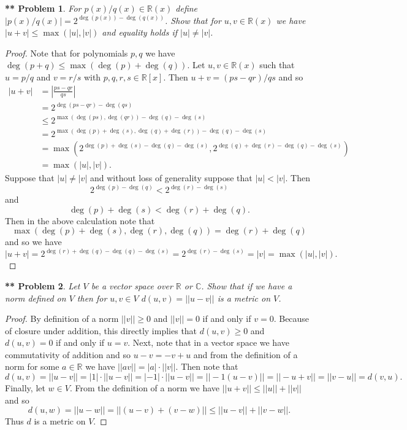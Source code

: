 \documentclass{article}
\newtheorem{**}{** Problem}
\begin{document}
\begin{flushleft}
\begin{**}
For $p(x)/q(x) \in \mathbb{R}(x)$ define $|p(x)/q(x)| = 2^{\deg(p(x))-\deg(q(x))}$. Show that for $u,v \in \mathbb{R}(x)$ we have $|u+v| \leq \max (|u|, |v|)$ and equality holds if $|u| \neq |v|$.
\end{**}
\begin{proof}
Note that for polynomials $p,q$ we have $\deg(p + q) \leq \max (\deg(p) + \deg(q))$. Let $u,v \in \mathbb{R}(x)$ such that $u = p/q$ and $v = r/s$ with $p,q,r,s \in \mathbb{R}[x]$. Then $u + v = (ps - qr)/qs$ and so
\begin{align*}
|u+v|
&= \left | \frac{ps - qr}{qs} \right |\\
&= 2^{\deg(ps - qr) - \deg(qs)}\\
&\leq 2^{\max (\deg(ps), \deg(qr)) - \deg(q) - \deg(s)}\\
&= 2^{\max (\deg(p) + \deg(s), \deg(q) + \deg(r)) - \deg(q) - \deg(s)}\\
&= \max (2^{\deg(p) + \deg(s) - \deg(q) - \deg(s)}, 2^{\deg(q) + \deg(r) - \deg(q) - \deg(s)})\\
&= \max (|u|, |v|).
\end{align*}
Suppose that $|u| \neq |v|$ and without loss of generality suppose that $|u| < |v|$. Then
\[
2^{\deg(p) - \deg(q)} < 2^{\deg(r) - \deg(s)}
\]
and
\[
\deg(p) + \deg(s) < \deg(r) + \deg(q).
\]
Then in the above calculation note that
\[
\max (\deg(p) + \deg(s), \deg(r) , \deg(q)) = \deg(r) + \deg(q)
\]
and so we have
\[
|u+v| = 2^{\deg(r) + \deg(q) - \deg(q) - \deg(s)} = 2^{\deg(r) - \deg(s)} = |v| = \max (|u|, |v|).
\]
\end{proof}

\begin{**}
Let $V$ be a vector space over $\mathbb{R}$ or $\mathbb{C}$. Show that if we have a norm defined on $V$ then for $u,v \in V$ $d(u,v) = ||u-v||$ is a metric on $V$.
\end{**}
\begin{proof}
By definition of a norm $||v|| \geq 0$ and $||v|| = 0$ if and only if $v = 0$. Because of closure under addition, this directly implies that $d(u,v) \geq 0$ and $d(u,v) = 0$ if and only if $u = v$. Next, note that in a vector space we have commutativity of addition and so $u-v = -v+u$ and from the definition of a norm for some $a \in \mathbb{R}$ we have $||a v|| = |a| \cdot ||v||$. Then note that
\[
d(u,v) = ||u-v|| = |1| \cdot ||u-v|| = |-1| \cdot ||u-v|| = ||-1(u-v)|| = ||-u + v|| = ||v-u|| = d(v,u).
\]
Finally, let $w \in V$. From the definition of a norm we have $||u+v|| \leq ||u|| + ||v||$ and so
\[
d(u,w) = ||u-w|| = ||(u-v) + (v-w)|| \leq ||u-v|| + ||v-w||.
\]
Thus $d$ is a metric on $V$.
\end{proof}


\end{flushleft}
\end{document}
